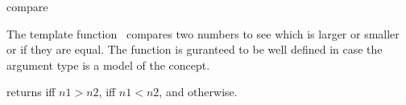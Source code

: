 \begin{ccRefFunction}{compare}

\ccDefinition

The template function \ccRefName\ compares two numbers to see which is larger or
smaller or if they are equal. The function is guranteed to be well defined in case the argument type 
is a model of the  concept. 


{returns  iff $n1>n2$,  iff $n1<n2$, and 
otherwise.}

\\
\\

\end{ccRefFunction}
